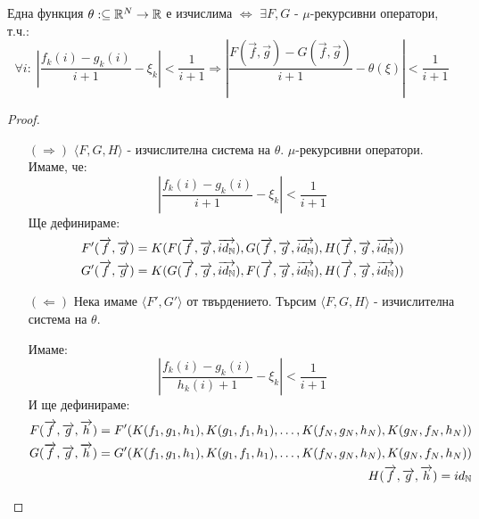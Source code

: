 \begin{proposition}[Гжегорчик]
    Една функция $\theta: \subseteq {\mathbb{R}}^N \to {\mathbb{R}}$ е изчислима $\iff$ $\exists F, G$ - $\mu$-рекурсивни оператори, т.ч.:
    \begin{equation}
        \forall i:\; \left|\frac{f_k(i) - g_k(i)}{i+1} - \xi_k\right| < \frac{1}{i+1} \Rightarrow \left| \frac{F(\overrightarrow f, \overrightarrow g) - G(\overrightarrow f, \overrightarrow g)}{i + 1} - \theta(\xi)\right| < \frac{1}{i+1}
    \end{equation}
\end{proposition}
\begin{proof}
    \begin{itemize}
        \item[$(\Rightarrow)$] $\langle F, G, H\rangle$ - изчислителна система на $\theta$. $\mu$-рекурсивни оператори. Имаме, че:
        \begin{equation}
            \left|\frac{f_k(i) - g_k(i)}{i+1} - \xi_k\right| < \frac{1}{i+1}
        \end{equation}
        Ще дефинираме:
        \begin{equation}
            \begin{split}
                F'(\overrightarrow f, \overrightarrow g) = K(F(\overrightarrow f, \overrightarrow g, \overrightarrow{id_{\mathbb{N}}}), G(\overrightarrow f, \overrightarrow g, \overrightarrow{id_{\mathbb{N}}}), H(\overrightarrow f, \overrightarrow g, \overrightarrow{id_{\mathbb{N}}}))\\
                G'(\overrightarrow f, \overrightarrow g) = K(G(\overrightarrow f, \overrightarrow g, \overrightarrow{id_{\mathbb{N}}}), F(\overrightarrow f, \overrightarrow g, \overrightarrow{id_{\mathbb{N}}}), H(\overrightarrow f, \overrightarrow g, \overrightarrow{id_{\mathbb{N}}}))
            \end{split}
        \end{equation}
        \item[$(\Leftarrow)$] Нека имаме $\langle F', G' \rangle$ от твърдението. Търсим $\langle F, G, H\rangle$ - изчислителна система на $\theta$.

        Имаме:
        \begin{equation}
            \left|\frac{f_k(i) - g_k(i)}{h_k(i) + 1} - \xi_k\right| < \frac{1}{i+1}
        \end{equation}
        И ще дефинираме:
        \begin{equation}
            \begin{split}
                F(\overrightarrow f, \overrightarrow g, \overrightarrow h) = F'(K(f_1, g_1, h_1), K(g_1, f_1, h_1), \dots, K(f_N, g_N, h_N), K(g_N, f_N, h_N)) \\
                G(\overrightarrow f, \overrightarrow g, \overrightarrow h) = G'(K(f_1, g_1, h_1), K(g_1, f_1, h_1), \dots, K(f_N, g_N, h_N), K(g_N, f_N, h_N)) \\
                H(\overrightarrow f, \overrightarrow g, \overrightarrow h) = id_{\mathbb{N}} \\
            \end{split}
        \end{equation}
    \end{itemize}
\end{proof}

